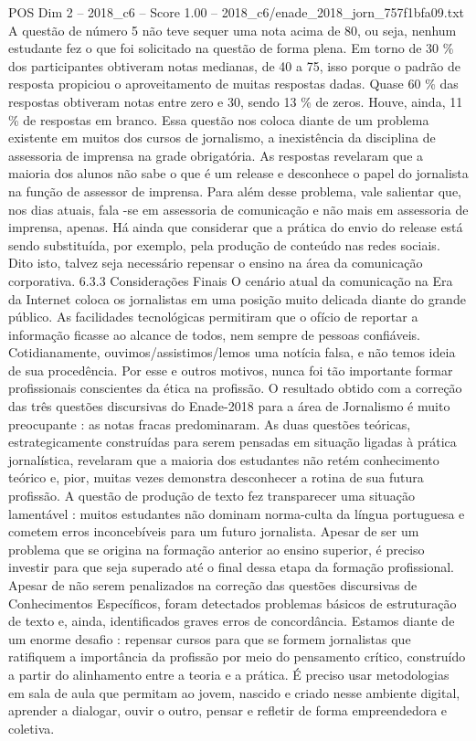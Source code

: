\begin{textsample}{POS Dim 2 – 2018\_c6 – Score 1.00 – 2018\_c6/enade\_2018\_jorn\_757f1bfa09.txt}
A questão de número 5 não teve sequer uma nota acima de 80, ou seja, nenhum estudante fez o que foi solicitado na questão de forma plena.
Em torno de 30 \% dos participantes obtiveram notas medianas, de 40 a 75, isso porque o padrão de resposta propiciou o aproveitamento de muitas respostas dadas.
Quase 60 \% das respostas obtiveram notas entre zero e 30, sendo 13 \% de zeros.
Houve, ainda, 11 \% de respostas em branco.
Essa questão nos coloca diante de um problema existente em muitos dos cursos de jornalismo, a inexistência da disciplina de assessoria de imprensa na grade obrigatória.
As respostas revelaram que a maioria dos alunos não sabe o que é um release e desconhece o papel do jornalista na função de assessor de imprensa.
Para além desse problema, vale salientar que, nos dias atuais, fala -se em assessoria de comunicação e não mais em assessoria de imprensa, apenas.
Há ainda que considerar que a prática do envio do release está sendo substituída, por exemplo, pela produção de conteúdo nas redes sociais.
Dito isto, talvez seja necessário repensar o ensino na área da comunicação corporativa. 6.3.3 Considerações Finais O cenário atual da comunicação na Era da Internet coloca os jornalistas em uma posição muito delicada diante do grande público.
As facilidades tecnológicas permitiram que o ofício de reportar a informação ficasse ao alcance de todos, nem sempre de pessoas confiáveis.
Cotidianamente, ouvimos/assistimos/lemos uma notícia falsa, e não temos ideia de sua procedência.
Por esse e outros motivos, nunca foi tão importante formar profissionais conscientes da ética na profissão.
O resultado obtido com a correção das três questões discursivas do Enade-2018 para a área de Jornalismo é muito preocupante : as notas fracas predominaram.
As duas questões teóricas, estrategicamente construídas para serem pensadas em situação ligadas à prática jornalística, revelaram que a maioria dos estudantes não retém conhecimento teórico e, pior, muitas vezes demonstra desconhecer a rotina de sua futura profissão.
A questão de produção de texto fez transparecer uma situação lamentável : muitos estudantes não dominam norma-culta da língua portuguesa e cometem erros inconcebíveis para um futuro jornalista.
Apesar de ser um problema que se origina na formação anterior ao ensino superior, é preciso investir para que seja superado até o final dessa etapa da formação profissional.
Apesar de não serem penalizados na correção das questões discursivas de Conhecimentos Específicos, foram detectados problemas básicos de estruturação de texto e, ainda, identificados graves erros de concordância.
Estamos diante de um enorme desafio : repensar cursos para que se formem jornalistas que ratifiquem a importância da profissão por meio do pensamento crítico, construído a partir do alinhamento entre a teoria e a prática.
É preciso usar metodologias em sala de aula que permitam ao jovem, nascido e criado nesse ambiente digital, aprender a dialogar, ouvir o outro, pensar e refletir de forma empreendedora e coletiva.

\end{textsample}
